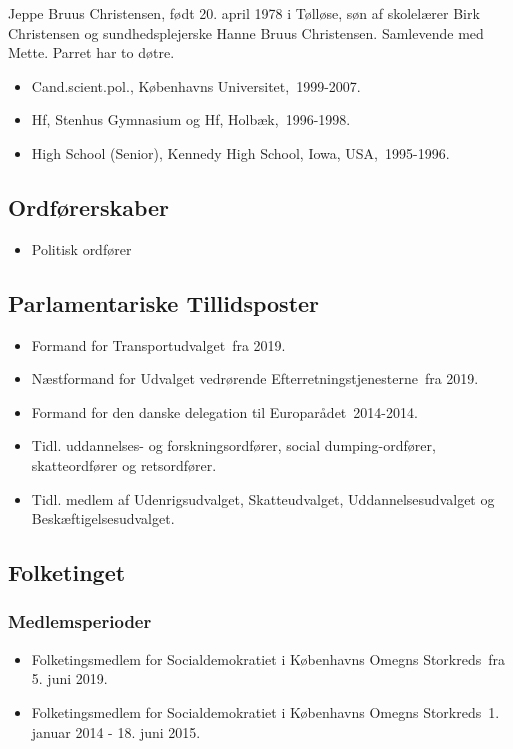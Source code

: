 \documentclass[11pt, a4paper]{awesome-cv}
\begin{document}
\makecvheader[R]
\makelettertitle
\begin{cvletter}
Jeppe Bruus Christensen, født 20. april 1978 i Tølløse, søn af skolelærer Birk Christensen og sundhedsplejerske Hanne Bruus Christensen. Samlevende med Mette. Parret har to døtre.

\begin{itemize}
\item Cand.scient.pol., Københavns Universitet, 1999-2007.
\item Hf, Stenhus Gymnasium og Hf, Holbæk, 1996-1998.
\item High School (Senior), Kennedy High School, Iowa, USA, 1995-1996.
\end{itemize}
\subsection*{Ordførerskaber}
\begin{itemize}
\item Politisk ordfører
\end{itemize}
\subsection*{Parlamentariske Tillidsposter}
\begin{itemize}
\item Formand for Transportudvalget fra 2019.
\item Næstformand for Udvalget vedrørende Efterretningstjenesterne fra 2019.
\item Formand for den danske delegation til Europarådet 2014-2014.
\item Tidl. uddannelses- og forskningsordfører, social dumping-ordfører, skatteordfører og retsordfører.
\item Tidl. medlem af Udenrigsudvalget, Skatteudvalget, Uddannelsesudvalget og Beskæftigelsesudvalget.
\end{itemize}
\subsection*{Folketinget}
\subsubsection*{Medlemsperioder}
\begin{itemize}
\item Folketingsmedlem for Socialdemokratiet i Københavns Omegns Storkreds fra 5. juni 2019.
\item Folketingsmedlem for Socialdemokratiet i Københavns Omegns Storkreds 1. januar 2014 - 18. juni 2015.
\end{itemize}

\end{cvletter}
\end{document}
